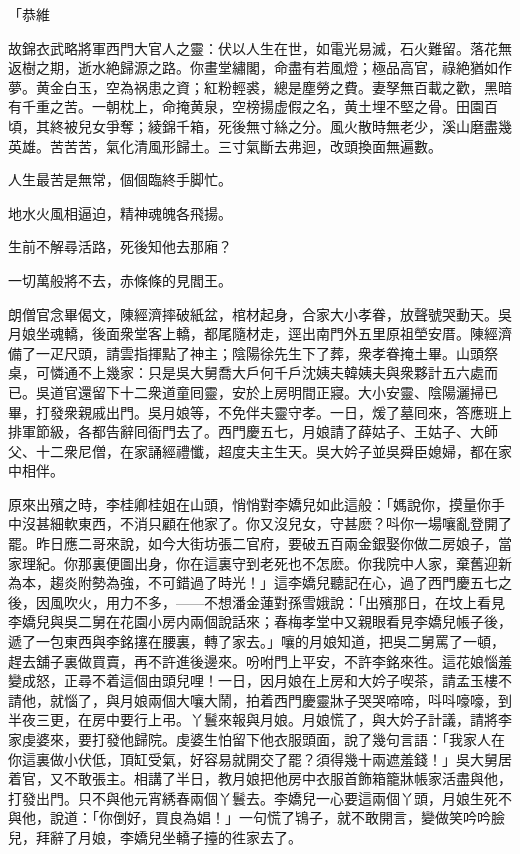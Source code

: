 \begin{myquote}
「恭維

故錦衣武略將軍西門大官人之靈：伏以人生在世，如電光易滅，石火難留。落花無返樹之期，逝水絶歸源之路。你畫堂繡閣，命盡有若風燈；極品高官，祿絶猶如作夢。黄金白玉，空為祸患之資；紅粉輕裘，總是塵勞之費。妻孥無百載之歡，黑暗有千重之苦。一朝枕上，命掩黄泉，空榜揚虚假之名，黄土埋不堅之骨。田園百頃，其終被兒女爭奪；綾錦千箱，死後無寸絲之分。風火散時無老少，溪山磨盡幾英雄。苦苦苦，氣化清風形歸土。三寸氣斷去弗迴，改頭換面無遍數。

{}

人生最苦是無常，個個臨終手脚忙。

地水火風相逼迫，精神魂魄各飛揚。

生前不解尋活路，死後知他去那廂？

一切萬般將不去，赤條條的見閻王。
\end{myquote}

朗僧官念畢偈文，陳經濟摔破紙盆，棺材起身，合家大小孝眷，放聲號哭動天。吳月娘坐魂轎，後面衆堂客上轎，都尾隨材走，逕出南門外五里原祖塋安厝。陳經濟備了一疋尺頭，請雲指揮點了神主；陰陽徐先生下了葬，衆孝眷掩土畢。山頭祭桌，可憐通不上幾家：只是吳大舅喬大戶何千戶沈姨夫韓姨夫與衆夥計五六處而已。吳道官還留下十二衆道童囘靈，安於上房明間正寢。大小安靈、陰陽灑掃已畢，打發衆親戚出門。吳月娘等，不免伴夫靈守孝。一日，煖了墓囘來，答應班上排軍節級，各都告辭囘衙門去了。西門慶五七，月娘請了薛姑子、王姑子、大師父、十二衆尼僧，在家誦經禮懺，超度夫主生天。吳大妗子並吳舜臣媳婦，都在家中相伴。

原來出殯之時，李桂卿桂姐在山頭，悄悄對李嬌兒如此這般：「媽說你，摸量你手中沒甚細軟東西，不消只顧在他家了。你又沒兒女，守甚麽？呌你一場嚷亂登開了罷。昨日應二哥來說，如今大街坊張二官府，要破五百兩金銀娶你做二房娘子，當家理紀。你那裏便圖出身，你在這裏守到老死也不怎麽。你我院中人家，棄舊迎新為本，趨炎附勢為強，不可錯過了時光！」這李嬌兒聽記在心，過了西門慶五七之後，因風吹火，用力不多，——不想潘金蓮對孫雪娥說：「出殯那日，在坟上看見李嬌兒與吳二舅在花園小房内兩個說話來；春梅孝堂中又親眼看見李嬌兒帳子後，遞了一包東西與李銘㩙在腰裏，轉了家去。」嚷的月娘知道，把吳二舅罵了一頓，趕去舖子裏做買賣，再不許進後邊來。吩咐門上平安，不許李銘來徃。這花娘惱羞變成怒，正尋不着這個由頭兒哩！一日，因月娘在上房和大妗子喫茶，請孟玉樓不請他，就惱了，與月娘兩個大嚷大鬧，拍着西門慶靈牀子哭哭啼啼，呌呌嚎嚎，到半夜三更，在房中要行上弔。丫鬟來報與月娘。月娘慌了，與大妗子計議，請將李家虔婆來，要打發他歸院。虔婆生怕留下他衣服頭面，說了幾句言語：「我家人在你這裏做小伏低，頂缸受氣，好容易就開交了罷？須得幾十兩遮羞錢！」吳大舅居着官，又不敢張主。相講了半日，教月娘把他房中衣服首飾箱籠牀帳家活盡與他，打發出門。只不與他元宵綉春兩個丫鬟去。李嬌兒一心要這兩個丫頭，月娘生死不與他，說道：「你倒好，買良為娼！」一句慌了鴇子，就不敢開言，變做笑吟吟臉兒，拜辭了月娘，李嬌兒坐轎子擡的徃家去了。

